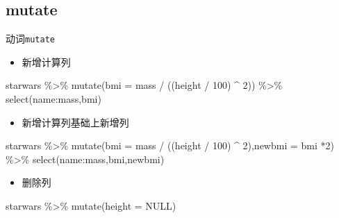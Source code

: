 \documentclass[
]{book}
\newenvironment{Shaded}{\begin{snugshade}}{\end{snugshade}}
\newcommand{\AttributeTok}[1]{\textcolor[rgb]{0.77,0.63,0.00}{#1}}
\newcommand{\ConstantTok}[1]{\textcolor[rgb]{0.00,0.00,0.00}{#1}}
\newcommand{\DecValTok}[1]{\textcolor[rgb]{0.00,0.00,0.81}{#1}}
\newcommand{\FunctionTok}[1]{\textcolor[rgb]{0.00,0.00,0.00}{#1}}
\newcommand{\NormalTok}[1]{#1}
\newcommand{\SpecialCharTok}[1]{\textcolor[rgb]{0.00,0.00,0.00}{#1}}
\providecommand{\tightlist}{%
  \setlength{\itemsep}{0pt}\setlength{\parskip}{0pt}}
\begin{document}
\hypertarget{mutate}{%
\subsection{mutate}\label{mutate}}

动词\texttt{mutate}

\begin{itemize}
\tightlist
\item
  新增计算列
\end{itemize}

\begin{Shaded}
\begin{Highlighting}[]
\NormalTok{starwars }\SpecialCharTok{\%\textgreater{}\%} 
  \FunctionTok{mutate}\NormalTok{(}\AttributeTok{bmi =}\NormalTok{ mass }\SpecialCharTok{/}\NormalTok{ ((height }\SpecialCharTok{/} \DecValTok{100}\NormalTok{)  }\SpecialCharTok{\^{}} \DecValTok{2}\NormalTok{)) }\SpecialCharTok{\%\textgreater{}\%} 
  \FunctionTok{select}\NormalTok{(name}\SpecialCharTok{:}\NormalTok{mass,bmi)}
\end{Highlighting}
\end{Shaded}

\begin{itemize}
\tightlist
\item
  新增计算列基础上新增列
\end{itemize}

\begin{Shaded}
\begin{Highlighting}[]
\NormalTok{starwars }\SpecialCharTok{\%\textgreater{}\%} 
  \FunctionTok{mutate}\NormalTok{(}\AttributeTok{bmi =}\NormalTok{ mass }\SpecialCharTok{/}\NormalTok{ ((height }\SpecialCharTok{/} \DecValTok{100}\NormalTok{)  }\SpecialCharTok{\^{}} \DecValTok{2}\NormalTok{),}\AttributeTok{newbmi =}\NormalTok{ bmi }\SpecialCharTok{*}\DecValTok{2}\NormalTok{) }\SpecialCharTok{\%\textgreater{}\%} 
  \FunctionTok{select}\NormalTok{(name}\SpecialCharTok{:}\NormalTok{mass,bmi,newbmi)}
\end{Highlighting}
\end{Shaded}

\begin{itemize}
\tightlist
\item
  删除列
\end{itemize}

\begin{Shaded}
\begin{Highlighting}[]
\NormalTok{starwars }\SpecialCharTok{\%\textgreater{}\%} \FunctionTok{mutate}\NormalTok{(}\AttributeTok{height =} \ConstantTok{NULL}\NormalTok{)}
\end{Highlighting}
\end{Shaded}
\end{document}
